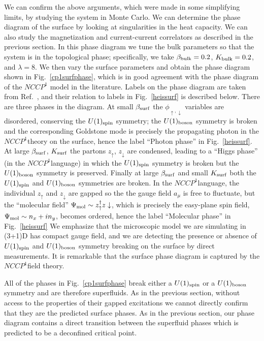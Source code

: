 \documentclass[prb,twocolumn]{revtex4-1}
\newcommand{\nccp}{$NCCP^1$}
\begin{document}
We can confirm the above arguments, which were made in some simplifying limits, by studying the system in Monte Carlo. We can determine the phase diagram of the surface by looking at singularities in the heat capacity. We can also study the magnetization and current-current correlators as described in the previous section. In this phase diagram we tune the bulk parameters so that the system is in the topological phase; specifically, we take $\beta_{\rm bulk}=0.2$, $K_{\rm bulk}=0.2$, and $\lambda=8$. We then vary the surface parameters and obtain the phase diagram shown in Fig.~\ref{cp1surfphase}, which is in good agreement with the phase diagram of the $NCCP^1$ model in the literature. Labels on the phase diagram are taken from Ref.~, and their relation to labels in Fig.~\ref{heissurf} is described below.
There are three phases in the diagram. At small $\beta_{\rm surf}$ the $\phi_{\uparrow, \downarrow}$ variables are disordered, conserving the $U(1)_{\rm spin}$ symmetry; the $U(1)_{\rm boson}$ symmetry is broken and the corresponding Goldstone mode is precisely the propagating photon in the \nccp theory on the surface, hence the label ``Photon phase'' in Fig.~\ref{heissurf}. 
At large $\beta_{\rm surf}$, $K_{\rm surf}$ the partons $z_\uparrow$, $z_\downarrow$ are condensed, leading to a ``Higgs phase'' (in the \nccp language) in which the $U(1)_{\rm spin}$ symmetry is broken but the $U(1)_{\rm boson}$ symmetry is preserved. 
Finally at large $\beta_{\rm surf}$ and small $K_{\rm surf}$ both the $U(1)_{\rm spin}$ and $U(1)_{\rm boson}$ symmetries are broken.  In the \nccp language, the individual $z_\uparrow$ and $z_\downarrow$ are gapped so the the gauge field $a_\mu$ is free to fluctuate, but the ``molecular field'' $\Psi_{\rm mol} \sim z_\uparrow^\dagger z\downarrow$, which is precisely the easy-plane spin field, $\Psi_{\rm mol} \sim n_x + in_y$, becomes ordered, hence the label ``Molecular phase'' in Fig.~\ref{heissurf}
We emphasize that the microscopic model we are simulating in (3+1)D has compact gauge field, and we are detecting the presence or absence of $U(1)_{\rm spin}$ and $U(1)_{\rm boson}$ symmetry breaking on the surface by direct measurements.  It is remarkable that the surface phase diagram is captured by the \nccp field theory.   

All of the phases in Fig.~\ref{cp1surfphase} break either a $U(1)_{\rm spin}$ or a $U(1)_{\rm boson}$ symmetry and are therefore superfluids. As in the previous section, without access to the properties of their gapped excitations we cannot directly confirm that they are the predicted surface phases. As in the previous section, our phase diagram contains a direct transition between the superfluid phases which is predicted to be a deconfined critical point.\cite{SenthilVishwanath}
\end{document}
